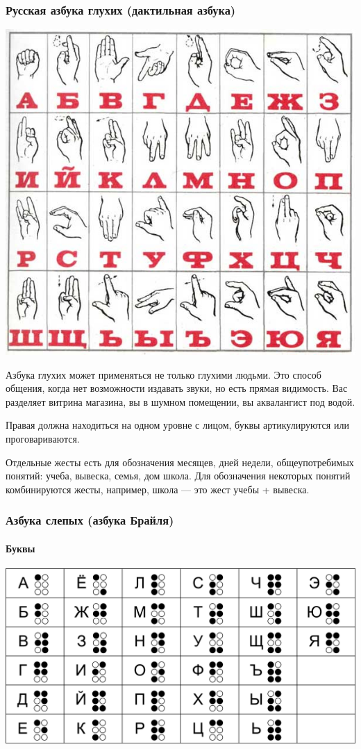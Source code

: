 \begin{frame}
    \frametitle{Русская азбука глухих (дактильная азбука)}
    
    \begin{center}
        \includegraphics[width=.7\textwidth]{fig/dactile}
    \end{center}
\end{frame}

Азбука глухих может применяться не только глухими людьми. Это способ общения, когда нет возможности издавать звуки, но есть прямая видимость. Вас разделяет витрина магазина, вы в шумном помещении, вы аквалангист под водой.

Правая должна находиться на одном уровне с лицом, буквы артикулируются или проговариваются.

Отдельные жесты есть для обозначения месящев, дней недели, общеупотребимых понятий: учеба, вывеска, семья, дом школа. Для обозначения некоторых понятий комбинируются жесты, например, школа --- это жест учебы + вывеска.

\begin{frame}
    \frametitle{Азбука слепых (азбука Брайля)}
    \framesubtitle{Буквы}
    
    \begin{center}
        \includegraphics[width=.8\textwidth]{fig/braileLetters}
    \end{center}
\end{frame}

